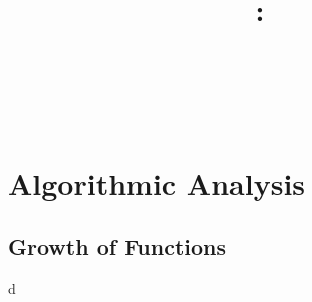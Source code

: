 \documentclass{article}
\title{
    \vspace{2in}
    \textbf{\lectClass:\\ \lectTitle}\\
    \vspace{0.1in}\large{\textit{\lectClassInstructor\ \lectSection}}
    \vspace{3in}
    \author{\textbf{\lectAuthorName}}
    \date{}
}
\begin{document}
\maketitle
\pagebreak

\section*{Algorithmic Analysis}

\subsection*{Growth of Functions}
    d
\end{document}
